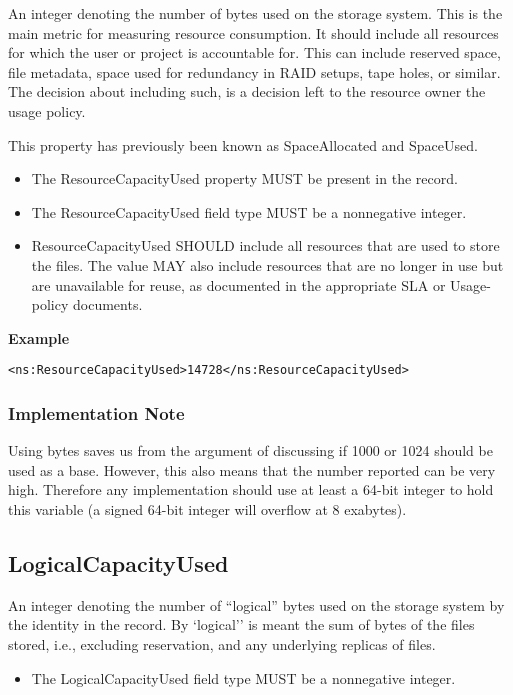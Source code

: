 An integer denoting the number of bytes used on the storage system. This is the
main metric for measuring resource consumption. It should include all resources
for which the user or project is accountable for. This can include reserved
space, file metadata, space used for redundancy in RAID setups, tape holes,
or similar. The decision about including such, is a decision left to the
resource owner the usage policy.

This property has previously been known as SpaceAllocated and SpaceUsed.

\begin{itemize}
\item The ResourceCapacityUsed property MUST be present in the record.
\item The ResourceCapacityUsed field type MUST be a nonnegative integer.
\item ResourceCapacityUsed SHOULD include all resources that are used to store
      the files.  The value MAY also include resources that are no longer in use
      but are unavailable for reuse, as documented in the appropriate SLA or
      Usage-policy documents.
\end{itemize}

{\bf Example}
\begin{verbatim}
<ns:ResourceCapacityUsed>14728</ns:ResourceCapacityUsed>
\end{verbatim}

\subsubsection*{Implementation Note}

Using bytes saves us from the argument of discussing if 1000 or 1024 should be
used as a base. However, this also means that the number reported can be very
high. Therefore any implementation should use at least a 64-bit integer to hold
this variable (a signed 64-bit integer will overflow at 8 exabytes).


\subsection{LogicalCapacityUsed}

An integer denoting the number of ``logical'' bytes used on the storage system
by the identity in the record. By `logical'' is meant the sum of bytes of 
the files stored, i.e., excluding reservation, and any underlying 
replicas of files.

\begin{itemize}
\item The LogicalCapacityUsed field type MUST be a nonnegative integer.
\end{itemize}

